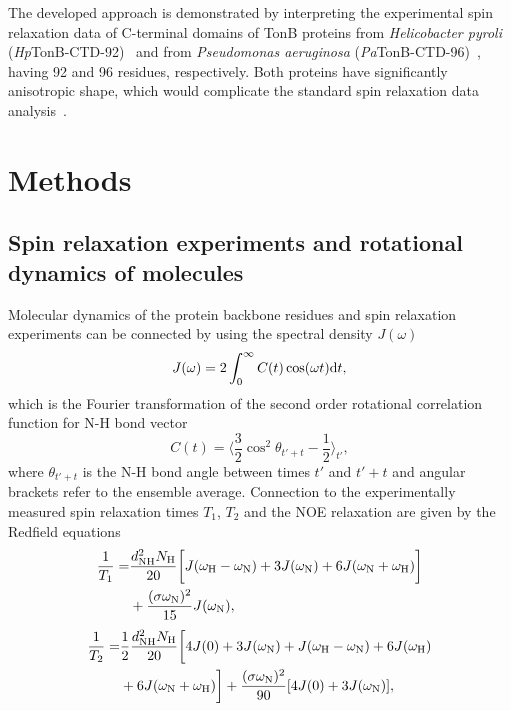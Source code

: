 \documentclass[journal=jpcbfk,manuscript=article]{achemso}
\begin{document}
The developed approach is demonstrated by interpreting the experimental spin relaxation data 
of C-terminal domains of TonB proteins from {\it Helicobacter pyroli} ({\it Hp}TonB-CTD-92)~\cite{ciragan16}
and from {\it Pseudomonas aeruginosa} ({\it Pa}TonB-CTD-96)~\cite{oeemig17}, having
92 and 96 residues, respectively. Both proteins have significantly
anisotropic shape, which would complicate the standard spin relaxation data
analysis~\cite{woessner62,shimizu62,jarymowycz06,korzhnev01,luginbuhl97,hall04}.


\section{Methods}

\subsection{Spin relaxation experiments and rotational dynamics of molecules}
Molecular dynamics of the protein backbone residues and spin relaxation experiments can
be connected by using the spectral density $J(\omega)$ 
\begin{equation}\label{SPECTdens}
  J(\omega)=2\int_0^\infty C(t) \cos(\omega t) {\rm d}t,
\end{equation}
which is the Fourier transformation of the second order
rotational correlation function for N-H bond vector
\begin{equation}\label{CORRFdef}
  C(t)=\langle \frac{3}{2}\cos^2\theta_{t'+t}-\frac{1}{2} \rangle_{t'},
\end{equation}
where $\theta_{t'+t}$ is the N-H bond angle between times $t'$ and $t'+t$
and angular brackets refer to the ensemble average.
Connection to the experimentally measured spin relaxation times $T_1$, $T_2$
and the NOE relaxation are given by the Redfield equations~\cite{abragam,kay89}
\begin{equation}\label{R1}
  \begin{aligned}
  \frac{1}{T_1}= & \frac{d_{\rm{NH}}^2N_{\rm{H}}}{20}\bigg[J(\omega_{\rm{H}}-\omega_{\rm{N}})+3J(\omega_{\rm{N}})+6J(\omega_{\rm{N}}+\omega_{\rm{H}})\bigg] \\
        & +\frac{(\sigma \omega_{\rm{N}})^2}{15}J(\omega_{\rm{N}}),
  \end{aligned}
\end{equation}
\begin{equation}\label{R2}
    \begin{aligned}
  \frac{1}{T_2}= & \frac{1}{2}\frac{d_{\rm{NH}}^2N_{\rm{H}}}{20}\bigg[4J(0)+3J(\omega_{\rm{N}})+J(\omega_{\rm{H}}-\omega_{\rm{N}})+6J(\omega_{\rm{H}})  \\
    & +6J(\omega_{\rm{N}}+\omega_{\rm{H}})\bigg]+\frac{(\sigma \omega_{\rm{N}})^2}{90}[4J(0) +3J(\omega_{\rm{N}})],
    \end{aligned}
\end{equation}
\end{document}
